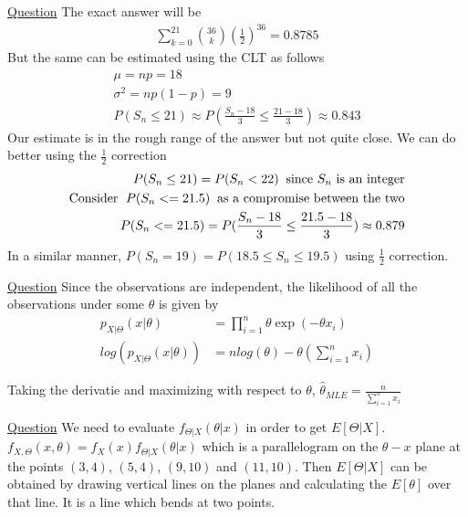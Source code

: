 \documentclass[11pt, a4paper]{article}
\begin{document}
\begin{enumerate}
        \hypertarget{a_binclt}{\item} \hyperlink{q_binclt}{Question}
        The exact answer will be
        \begin{align*}
            \sum_{k=0}^{21}\binom{36}{k}(\frac{1}{2})^{36} = 0.8785
        \end{align*}
        But the same can be estimated using the CLT as follows
        \begin{align*}
            \mu = np = 18\\
            \sigma^{2} = np(1-p) = 9\\
            P(S_{n} \leq 21) \approx P(\frac{S_{n} - 18}{3} \leq \frac{21-18}{3}) \approx 0.843
        \end{align*}
        Our estimate is in the rough range of the answer but not quite close. We can do better using the $\frac{1}{2}$ correction
        \begin{align*}
            P(S_{n} \leq 21) = P(S_{n} < 22) \text{\;\;since $S_{n}$ is an integer}\\
            \text{Consider \;}P(S_{n} <= 21.5) \text{\;\;as a compromise between the two}\\
            P(S_{n} <= 21.5) = P(\frac{S_{n} - 18}{3} \leq \frac{21.5 - 18}{3}) \approx 0.879
        \end{align*}
        In a similar manner, $P(S_{n}=19) = P(18.5 \leq S_{n} \leq 19.5)$ using $\frac{1}{2}$ correction.


        \hypertarget{a_mleestimate}{\item} \hyperlink{q_mleestimate}{Question}\newline
        Since the observations are independent, the likelihood of all the observations under some $\theta$ is given by
        \begin{align*}
            p_{X|\Theta}(x|\theta) &= \prod_{i=1}^{n} \theta \exp(-\theta x_{i})\\
            log(p_{X|\Theta}(x|\theta)) &= n log(\theta) - \theta(\sum_{i=1}^{n} x_{i})
        \end{align*}

        Taking the derivatie and maximizing with respect to $\theta$, $\hat{\theta}_{MLE} = \frac{n}{\sum_{i=1}^{n}x_{i}}$


        \hypertarget{a_lmsestimate}{\item} \hyperlink{q_lmsestimate}{Question}\newline
        We need to evaluate $f_{\Theta|X}(\theta|x)$ in order to get $E[\Theta|X]$.
        \newline
        $f_{X,\Theta}(x,\theta) = f_{X}(x) f_{\Theta|X}(\theta|x)$ which is a parallelogram on the $\theta-x$ plane at the points  $(3,4)$, $(5,4)$, $(9,10)$ and $(11,10)$. Then $E[\Theta|X]$ can be obtained by drawing vertical lines on the planes and calculating the $E[\theta]$ over that line. It is a line which bends at two points.


\end{enumerate}
\end{document}
